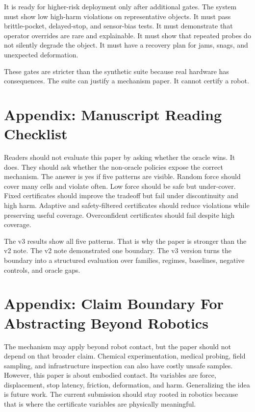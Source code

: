 \documentclass{article}
\begin{document}
It is ready for higher-risk deployment only after additional gates. The system
must show low high-harm violations on representative objects. It must pass
brittle-pocket, delayed-stop, and sensor-bias tests. It must demonstrate that
operator overrides are rare and explainable. It must show that repeated probes
do not silently degrade the object. It must have a recovery plan for jams,
snags, and unexpected deformation.

These gates are stricter than the synthetic suite because real hardware has
consequences. The suite can justify a mechanism paper. It cannot certify a
robot.

\section{Appendix: Manuscript Reading Checklist}

Readers should not evaluate this paper by asking whether the oracle wins. It
does. They should ask whether the non-oracle policies expose the correct
mechanism. The answer is yes if five patterns are visible. Random force should
cover many cells and violate often. Low force should be safe but under-cover.
Fixed certificates should improve the tradeoff but fail under discontinuity and
high harm. Adaptive and safety-filtered certificates should reduce violations
while preserving useful coverage. Overconfident certificates should fail
despite high coverage.

The v3 results show all five patterns. That is why the paper is stronger than
the v2 note. The v2 note demonstrated one boundary. The v3 version turns the
boundary into a structured evaluation over families, regimes, baselines,
negative controls, and oracle gaps.

\section{Appendix: Claim Boundary For Abstracting Beyond Robotics}

The mechanism may apply beyond robot contact, but the paper should not depend
on that broader claim. Chemical experimentation, medical probing, field
sampling, and infrastructure inspection can also have costly unsafe samples.
However, this paper is about embodied contact. Its variables are force,
displacement, stop latency, friction, deformation, and harm. Generalizing the
idea is future work. The current submission should stay rooted in robotics
because that is where the certificate variables are physically meaningful.
\end{document}
